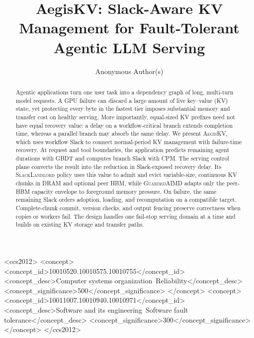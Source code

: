\documentclass[sigplan,review,anonymous]{acmart}
\newcommand{\system}{\textsc{AegisKV}}
\begin{document}
\title{AegisKV: Slack-Aware KV Management for Fault-Tolerant Agentic LLM Serving}

\author{Anonymous Author(s)}

\begin{CCSXML}
<ccs2012>
 <concept>
  <concept_id>10010520.10010575.10010755</concept_id>
  <concept_desc>Computer systems organization~Reliability</concept_desc>
  <concept_significance>500</concept_significance>
 </concept>
 <concept>
  <concept_id>10011007.10010940.10010971</concept_id>
  <concept_desc>Software and its engineering~Software fault tolerance</concept_desc>
  <concept_significance>300</concept_significance>
 </concept>
</ccs2012>
\end{CCSXML}

\begin{abstract}
Agentic applications turn one user task into a dependency graph of long,
multi-turn model requests.  A GPU failure can discard a large amount of live
key--value (KV) state, yet protecting every byte in the fastest tier imposes
substantial memory and transfer cost on healthy serving.  More importantly,
equal-sized KV prefixes need not have equal recovery value: a delay on a
workflow-critical branch extends completion time, whereas a parallel branch
may absorb the same delay.  We present \system{}, which uses workflow Slack to
connect normal-period KV management with failure-time recovery.  At request and
tool boundaries, the application predicts remaining agent durations with GBDT
and computes branch Slack with CPM.  The serving control plane converts the
result into the reduction in Slack-exposed recovery delay.  Its
\textsc{SlackLandlord} policy uses this value to admit and evict variable-size,
continuous KV chunks in DRAM and optional peer HBM, while
\textsc{GuardedAIMD} adapts only the peer-HBM capacity envelope to foreground
memory pressure.  On failure, the same remaining Slack orders adoption,
loading, and recomputation on a compatible target.  Complete-chunk commit,
version checks, and output fencing preserve correctness when copies or workers
fail.  The design handles one fail-stop serving domain at a time and builds on
existing KV storage and transfer paths.
\end{abstract}
\end{document}
